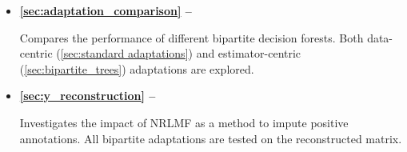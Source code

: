 \begin{mdframed}[frametitle={Related experiments}]

   \begin{itemize}
    \item \textbf{\autoref{sec:adaptation_comparison} -- }

    Compares the performance of different bipartite decision forests. Both data-centric (\autoref{sec:standard adaptations}) and estimator-centric (\autoref{sec:bipartite_trees}) adaptations are explored.

    \item \textbf{\autoref{sec:y_reconstruction} -- }

    Investigates the impact of NRLMF as a method to impute positive annotations.
    All bipartite adaptations are tested on the reconstructed matrix.

   \end{itemize}
\end{mdframed}





